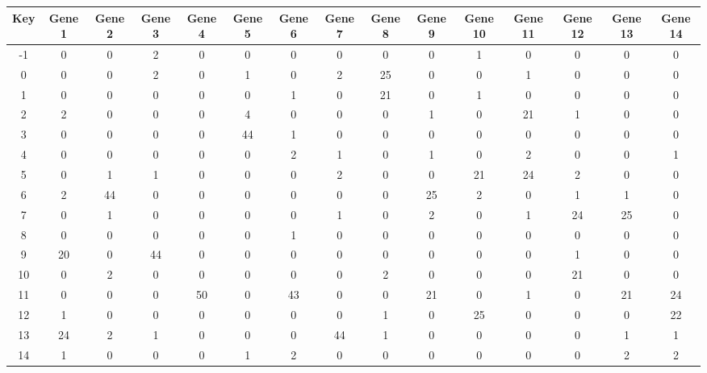 \begin{tabular}{|c|c|c|c|c|c|c|c|c|c|c|c|c|c|c|}
\hline
Key & Gene 1 & Gene 2 & Gene 3 & Gene 4 & Gene 5 & Gene 6 & Gene 7 & Gene 8 & Gene 9 & Gene 10 & Gene 11 & Gene 12 & Gene 13 & Gene 14 \\
\hline
-1 & 0 & 0 & 2 & 0 & 0 & 0 & 0 & 0 & 0 & 1 & 0 & 0 & 0 & 0 \\
0 & 0 & 0 & 2 & 0 & 1 & 0 & 2 & 25 & 0 & 0 & 1 & 0 & 0 & 0 \\
1 & 0 & 0 & 0 & 0 & 0 & 1 & 0 & 21 & 0 & 1 & 0 & 0 & 0 & 0 \\
2 & 2 & 0 & 0 & 0 & 4 & 0 & 0 & 0 & 1 & 0 & 21 & 1 & 0 & 0 \\
3 & 0 & 0 & 0 & 0 & 44 & 1 & 0 & 0 & 0 & 0 & 0 & 0 & 0 & 0 \\
4 & 0 & 0 & 0 & 0 & 0 & 2 & 1 & 0 & 1 & 0 & 2 & 0 & 0 & 1 \\
5 & 0 & 1 & 1 & 0 & 0 & 0 & 2 & 0 & 0 & 21 & 24 & 2 & 0 & 0 \\
6 & 2 & 44 & 0 & 0 & 0 & 0 & 0 & 0 & 25 & 2 & 0 & 1 & 1 & 0 \\
7 & 0 & 1 & 0 & 0 & 0 & 0 & 1 & 0 & 2 & 0 & 1 & 24 & 25 & 0 \\
8 & 0 & 0 & 0 & 0 & 0 & 1 & 0 & 0 & 0 & 0 & 0 & 0 & 0 & 0 \\
9 & 20 & 0 & 44 & 0 & 0 & 0 & 0 & 0 & 0 & 0 & 0 & 1 & 0 & 0 \\
10 & 0 & 2 & 0 & 0 & 0 & 0 & 0 & 2 & 0 & 0 & 0 & 21 & 0 & 0 \\
11 & 0 & 0 & 0 & 50 & 0 & 43 & 0 & 0 & 21 & 0 & 1 & 0 & 21 & 24 \\
12 & 1 & 0 & 0 & 0 & 0 & 0 & 0 & 1 & 0 & 25 & 0 & 0 & 0 & 22 \\
13 & 24 & 2 & 1 & 0 & 0 & 0 & 44 & 1 & 0 & 0 & 0 & 0 & 1 & 1 \\
14 & 1 & 0 & 0 & 0 & 1 & 2 & 0 & 0 & 0 & 0 & 0 & 0 & 2 & 2 \\
\hline
\end{tabular}